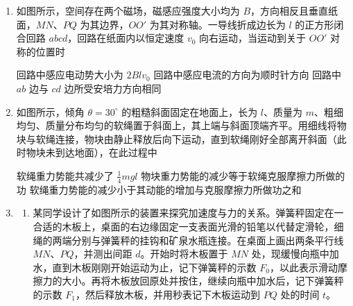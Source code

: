 \documentclass[\gkver]{gaokaozhenti}
\begin{document}
\begin{enumerate}
\item
如图所示，空间存在两个磁场，磁感应强度大小均为 $B$，方向相反且垂直纸面，$MN$、$PQ$ 为其边界，$OO'$ 为其对称轴。一导线折成边长为 $l$ 的正方形闭合回路 $abcd$，回路在纸面内以恒定速度 $v_{0}$ 向右运动，当运动到关于 $OO'$ 对称的位置时


{回路中感应电动势大小为 $2Blv_{0}$}
{回路中感应电流的方向为顺时针方向}
{回路中 $ab$ 边与 $cd$ 边所受安培力方向相同}


\item
如图所示，倾角 $\theta=30^{\circ}$ 的粗糙斜面固定在地面上，长为 $l$、质量为 $m$、粗细均匀、质量分布均匀的软绳置于斜面上，其上端与斜面顶端齐平。用细线将物块与软绳连接，物块由静止释放后向下运动，直到软绳刚好全部离开斜面（此时物块未到达地面），在此过程中


{软绳重力势能共减少了 $\frac{1}{4}mgl$}
{物块重力势能的减少等于软绳克服摩擦力所做的功}
{软绳重力势能的减少小于其动能的增加与克服摩擦力所做功之和}


\item
\begin{enumerate}
\item
某同学设计了如图所示的装置来探究加速度与力的关系。弹簧秤固定在一合适的木板上，桌面的右边缘固定一支表面光滑的铅笔以代替定滑轮，细绳的两端分别与弹簧秤的挂钩和矿泉水瓶连接。在桌面上画出两条平行线 $MN$、$PQ$，并测出间距 $d$。开始时将木板置于 $MN$ 处，现缓慢向瓶中加水，直到木板刚刚开始运动为止，记下弹簧秤的示数 $F_{0}$，以此表示滑动摩擦力的大小。再将木板放回原处并按住，继续向瓶中加水后，记下弹簧秤的示数 $F_{1}$，然后释放木板，并用秒表记下木板运动到 $PQ$ 处的时间 $t$。


\end{enumerate}
\end{enumerate}
\end{document}
